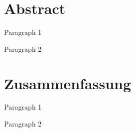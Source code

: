 \begingroup
\let\clearpage\relax
\let\cleardoublepage\relax
\let\cleardoublepage\relax

\chapter*{Abstract}

Paragraph 1 

\bigskip
Paragraph 2

\pagebreak


\chapter*{Zusammenfassung}

Paragraph 1

\bigskip
Paragraph 2



\endgroup			

\vfill
